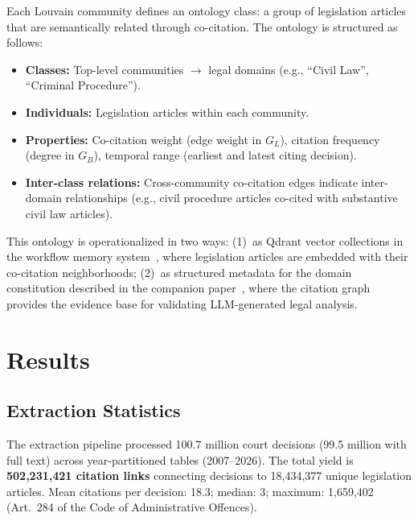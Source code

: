 \documentclass[11pt]{article}
\begin{document}
Each Louvain community defines an ontology class: a group of legislation articles that are semantically related through co-citation.
The ontology is structured as follows:

\begin{itemize}[leftmargin=*, nosep]
  \item \textbf{Classes:} Top-level communities $\to$ legal domains (e.g., ``Civil Law'', ``Criminal Procedure'').
  \item \textbf{Individuals:} Legislation articles within each community.
  \item \textbf{Properties:} Co-citation weight (edge weight in $G_L$), citation frequency (degree in $G_B$), temporal range (earliest and latest citing decision).
  \item \textbf{Inter-class relations:} Cross-community co-citation edges indicate inter-domain relationships (e.g., civil procedure articles co-cited with substantive civil law articles).
\end{itemize}

This ontology is operationalized in two ways:
(1)~as Qdrant vector collections in the workflow memory system~\citep{ovcharov2026workflowmemory}, where legislation articles are embedded with their co-citation neighborhoods;
(2)~as structured metadata for the domain constitution described in the companion paper~\citep{ovcharov2026bridge}, where the citation graph provides the evidence base for validating LLM-generated legal analysis.


\section{Results}
\label{sec:results}

\subsection{Extraction Statistics}
\label{sec:extraction-results}

The extraction pipeline processed 100.7 million court decisions (99.5 million with full text) across year-partitioned tables (2007--2026).
The total yield is \textbf{502,231,421 citation links} connecting decisions to 18,434,377 unique legislation articles.
Mean citations per decision: 18.3; median: 3; maximum: 1,659,402 (Art.~284 of the Code of Administrative Offences).
\end{document}
